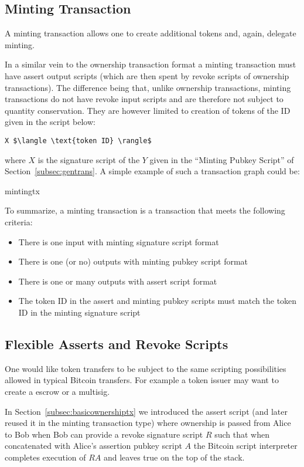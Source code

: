 \documentclass[9pt,oneside]{amsart}
\begin{document}
\subsection{Minting Transaction}
A minting transaction allows one to create additional tokens and, again, delegate minting.

In a similar vein to the ownership transaction format a minting transaction must have assert output scripts (which are then spent by revoke scripts of ownership transactions). The difference being that, unlike ownership transactions, minting transactions do not have revoke input scripts and are therefore not subject to quantity conservation. They are however limited to creation of tokens of the ID given in the script below:

\begin{lstlisting}[title={\textbf{Minting Signature Script}}]
X $\langle \text{token ID} \rangle$
\end{lstlisting}
where $X$ is the signature script of the $Y$ given in the ``Minting Pubkey Script'' of Section~\ref{subsec:gentrans}. A simple example of such a transaction graph could be: 
\begin{center}
{mintingtx}
\end{center}

To summarize, a minting transaction is a transaction that meets the following criteria:
\begin{itemize}
    \item There is one input with minting signature script format
    \item There is one (or no) outputs with minting pubkey script format
    \item There is one or many outputs with assert script format
    \item The token ID in the assert and minting pubkey scripts must match the token ID in the minting signature script
\end{itemize}

\subsection{Flexible Asserts and Revoke Scripts}\label{subsec:flexassertrevoke}
One would like token transfers to be subject to the same scripting possibilities allowed in typical Bitcoin transfers. For example a token issuer may want to create a escrow or a multisig.

In Section~\ref{subsec:basicownershiptx} we introduced the assert script (and later reused it in the minting transaction type) where ownership is passed from Alice to Bob when Bob can provide a revoke signature script $R$ such that when concatenated with Alice's assertion pubkey script $A$ the Bitcoin script interpreter completes execution of $RA$ and leaves true on the top of the stack. 
\end{document}
